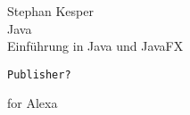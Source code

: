 \documentclass[]{gsm-l}
\theoremstyle{definition}
\theoremstyle{remark}
\numberwithin{section}{chapter}
\numberwithin{equation}{chapter}
\numberwithin{figure}{chapter}%
\numberwithin{table}{chapter}%
\begin{document}
\frontmatter

\begin{titlepage}
\vskip 3cm
\begin{flushleft}
{\Large Stephan Kesper}\\[1cm]
{\fontsize{48}{52} \selectfont Java}\\[1cm]
{\Large Einführung in Java und JavaFX}
\end{flushleft}
\vfill
\texttt{Publisher?}
\end{titlepage}


\cleardoublepage
\thispagestyle{empty}
\vspace*{13.5pc}
\begin{center}
  for Alexa
\end{center}
\cleardoublepage

\setcounter{page}{5}

\tableofcontents
\newpage

\listoffigures
\newpage

\listoftables
\newpage





\mainmatter








\appendix


\backmatter



\printindex
\end{document}
